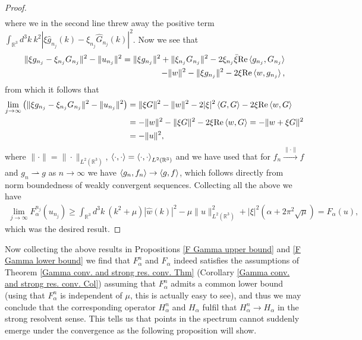 \documentclass[a4paper,11pt]{article}
\newcommand{\Real}{\text{Re}}
\newcommand{\R}{\mathbb{R}}
\numberwithin{equation}{section}
\begin{document}
\begin{proof}
\begin{equation}
\begin{aligned}
\end{aligned}
\end{equation}
where we in the second line threw away the positive term $ \int_{\R^3} d^3k\ k^2|\xi \hat{g}_{n_j}(k)-\xi_{n_j}\hat{G}_{n_j}(k)|^2 $. Now we see that \begin{equation}
\begin{aligned}
\|\xi g_{n_j}-\xi_{n_j}G_{n_j}\|^2-\|u_{n_j}\|^2=\|\xi g_{n_j}\|^2+\|\xi_{n_j}G_{n_j}\|^2-2\xi_{n_j}\bar{\xi}\Real\braket{g_{n_j},G_{n_j}}\\-\|w\|^2-\|\xi g_{n_j}\|^2-2\xi\Real\braket{w,g_{n_j}},
\end{aligned}
\end{equation}
from which it follows that\begin{equation}
\begin{aligned}
\lim\limits_{j\to\infty}\left(\|\xi g_{n_j}-\xi_{n_j}G_{n_j}\|^2-\|u_{n_j}\|^2\right)&=\|\xi G\|^2-\|w\|^2-2|\xi|^2\braket{G,G}-2\xi\Real\braket{w,G}\\&=-\|w\|^2-\|\xi G\|^2-2\xi\Real\braket{w,G}=-\|w+\xi G\|^2\\&=-\|u\|^2,
\end{aligned}
\end{equation}
where $ \|\cdot\|=\|\cdot\|_{L^2(\R^3)} $, $ \braket{\cdot,\cdot}=\braket{\cdot,\cdot}_{L^2(\R^3)} $ and we have used that for $ f_n\xrightarrow{\|\cdot\|}f $ and $ g_n\rightharpoonup g $ as $ n\to\infty $ we have $ \braket{g_n,f_n}\to\braket{g,f} $, which follows directly from norm boundedness of weakly convergent sequences. Collecting all the above we have \begin{equation}
\begin{aligned}
\lim\limits_{j\to\infty}F_\alpha^{n_j}(u_{n_j})\geq \int_{\R^3} d^3k\ \left(k^2+\mu\right)|\hat{w}(k)|^2-\mu\|u\|^2_{L^2(\R^3)}+|\xi|^2\left(\alpha+2\pi^2\sqrt{\mu}\right)=F_\alpha(u),
\end{aligned}
\end{equation}
which was the desired result.
\end{proof}
Now collecting the above results in Propositions \ref{F Gamma upper bound} and \ref{F Gamma lower bound} we find that $ F_\alpha^n $ and $ F_\alpha $ indeed satisfies the assumptions of Theorem \ref{Gamma conv. and strong res. conv. Thm} (Corollary \ref{Gamma conv. and strong res. conv. Col}) assuming that $ F_\alpha^n $ admits a common lower bound (using that $ F_\alpha^n $ is independent of $ \mu $, this is actually easy to see), and thus we may conclude that the corresponding operator $ H_\alpha^n $ and $ H_\alpha $ fulfil that $ H_\alpha^n\to H_\alpha $ in the strong resolvent sense. This tells us that points in the spectrum cannot suddenly emerge under the convergence as the following proposition will show.
\end{document}
